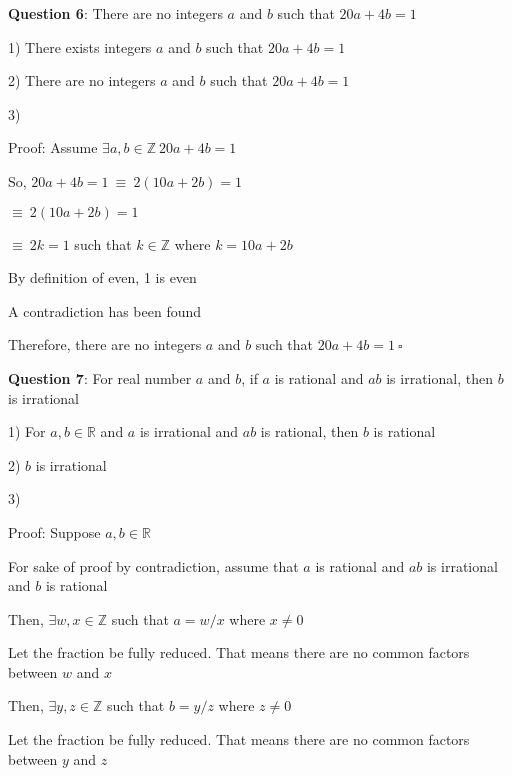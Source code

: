 \documentclass{article} %
\newcommand{\question}[2][]{\begin{flushleft}
        \textbf{Question #1}: #2
\end{flushleft}}
\begin{document}
    \question[6]{There are no integers $a$ and $b$ such that $20a + 4b = 1$}

    1) There exists integers $a$ and $b$ such that $20a + 4b = 1$

    2) There are no integers $a$ and $b$ such that $20a + 4b = 1$

    3)

    Proof: Assume $\exists a, b \in \mathbb{Z}\ 20a + 4b = 1$

    So, $20a + 4b = 1\ \equiv\ 2(10a + 2b) = 1$

    \tabto{3.26cm}$\equiv\ 2(10a + 2b) = 1$

    \tabto{3.26cm}$\equiv\ 2k = 1$ such that $k \in \mathbb{Z}$ where $k = 10a + 2b$

    By definition of even, 1 is even

    A contradiction has been found

    Therefore, there are no integers $a$ and $b$ such that $20a + 4b = 1\ \square$ 



                                                                   

    \question[7]{For real number $a$ and $b$, if $a$ is rational and $ab$ is irrational, then $b$ is irrational}

    1) For $a, b \in \mathbb{R}$ and $a$ is irrational and $ab$ is rational, then $b$ is rational

    2) $b$ is irrational

    3) 

    Proof: Suppose $a, b \in \mathbb{R}$

    For sake of proof by contradiction, assume that $a$ is rational and $ab$ is irrational and $b$ is rational
    
    Then, $\exists w, x \in \mathbb{Z}$ such that $a = w/x$ where $x \neq 0$

    Let the fraction be fully reduced. That means there are no common factors between $w$ and $x$
    
    Then, $\exists y, z \in \mathbb{Z}$ such that $b = y/z$ where $z \neq 0$

    Let the fraction be fully reduced. That means there are no common factors between $y$ and $z$
\end{document}

